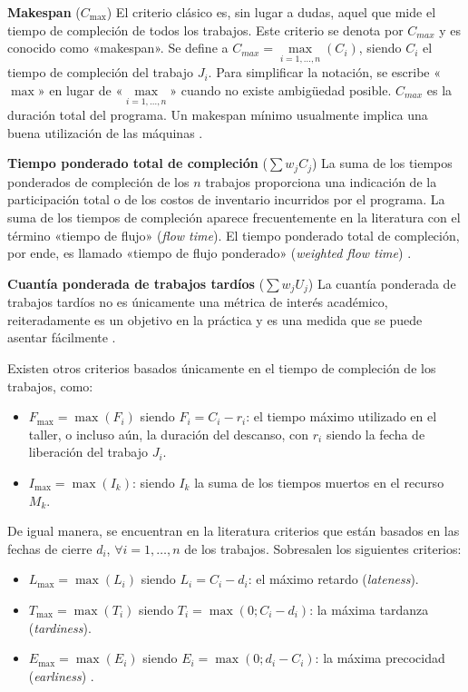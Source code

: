 \documentclass[spanish,draft,12pt,headsepline,footsepline,paper=letter]{scrreprt}
\begin{document}
\textbf{Makespan} ($C_{\max}$) El criterio clásico es, sin lugar a dudas, aquel que mide el tiempo de compleción de todos los trabajos. Este criterio se denota por $C_{max}$ y es conocido como «makespan». Se define a $C_{max} = \underset{i=1,\dots,n}{\max}(C_i)$, siendo $C_i$ el tiempo de compleción del trabajo $J_i$. Para simplificar la notación, se escribe «$\max$» en lugar de «$\underset{i=1,\dots,n}{\max}$» cuando no existe ambigüedad posible. $C_{max}$ es la duración total del programa. Un makespan mínimo usualmente implica una buena utilización de las máquinas \citep[p.~13, p.~18]{TKindt2002,Pinedo1995}.

\textbf{Tiempo ponderado total de compleción} ($\sum w_jC_j$) La suma de los tiempos ponderados de compleción de los $n$ trabajos proporciona una indicación de la participación total o de los costos de inventario incurridos por el programa. La suma de los tiempos de compleción aparece frecuentemente en la literatura con el término «tiempo de flujo» (\textit{flow time}). El tiempo ponderado total de compleción, por ende, es llamado «tiempo de flujo ponderado» (\textit{weighted flow time}) \citep[p.~18]{Pinedo1995}.

\textbf{Cuantía ponderada de trabajos tardíos} ($\sum w_jU_j$) 
La cuantía ponderada de trabajos tardíos no es únicamente una métrica de interés académico, reiteradamente es un objetivo en la práctica y es una medida que se puede asentar fácilmente \citep[p.~19]{Pinedo1995}.

Existen otros criterios basados únicamente en el tiempo de compleción de los trabajos, como:

\begin{itemize}
\item$F_{\max} = \max(F_i)$ siendo $F_i = C_i - r_i$: el tiempo máximo utilizado en el taller, o incluso aún, la duración del descanso, con $r_i$ siendo la fecha de liberación del trabajo $J_i$.
\item$I_{\max} = \max(I_k)$: siendo $I_k$ la suma de los tiempos muertos en el recurso $M_k$.
\end{itemize}
%
De igual manera, se encuentran en la literatura criterios que están basados en las fechas de cierre $d_i$, $\forall i = 1,\dots,n$ de los trabajos. Sobresalen los siguientes criterios:
%
\begin{itemize}
  \item $L_{\max} = \max(L_i)$ siendo $L_i = C_i - d_i$: el máximo retardo (\textit{lateness}).
  \item $T_{\max} = \max(T_i)$ siendo $T_i = \max(0; C_i - d_i)$: la máxima tardanza (\textit{tardiness}).
  \item $E_{\max} = \max(E_i)$ siendo $E_i = \max(0; d_i - C_i)$: la máxima precocidad (\textit{earliness}) \citep[p.~13]{TKindt2002}.
\end{itemize}
\end{document}
